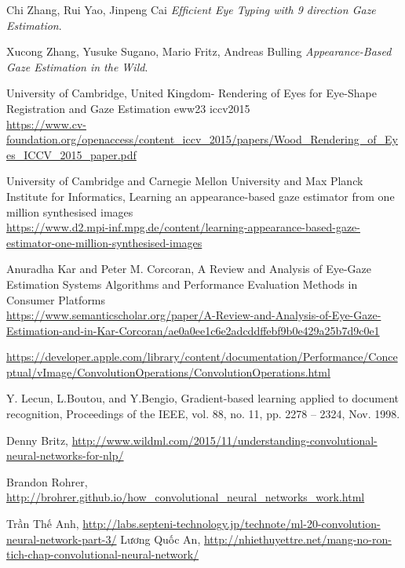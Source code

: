 \documentclass[12pt,a4paper,oneside]{book} %
\begin{document}
\begin{thebibliography}{99}

Chi Zhang, Rui Yao, Jinpeng Cai
\textit{Efﬁcient Eye Typing with 9 direction Gaze Estimation}.

Xucong Zhang, Yusuke Sugano, Mario Fritz, Andreas Bulling
\textit{Appearance-Based Gaze Estimation in the Wild}. 


University of Cambridge, United Kingdom- Rendering of Eyes for Eye-Shape Registration and Gaze Estimation eww23 iccv2015
\\\url{https://www.cv-foundation.org/openaccess/content_iccv_2015/papers/Wood_Rendering_of_Eyes_ICCV_2015_paper.pdf}

University of Cambridge and Carnegie Mellon University and Max Planck Institute for Informatics, Learning an appearance-based gaze estimator from one million synthesised images
\\\url{https://www.d2.mpi-inf.mpg.de/content/learning-appearance-based-gaze-estimator-one-million-synthesised-images}

Anuradha Kar and Peter M. Corcoran, A Review and Analysis of Eye-Gaze Estimation Systems Algorithms and Performance Evaluation Methods in Consumer Platforms
\\\url{https://www.semanticscholar.org/paper/A-Review-and-Analysis-of-Eye-Gaze-Estimation-and-in-Kar-Corcoran/ae0a0ee1c6e2adcddffebf9b0e429a25b7d9c0e1}


\url{https://developer.apple.com/library/content/documentation/Performance/Conceptual/vImage/ConvolutionOperations/ConvolutionOperations.html}

Y. Lecun, L.Boutou, and Y.Bengio, Gradient-based learning applied to document recognition, Proceedings of the IEEE, vol. 88, no. 11, pp. 2278 – 2324, Nov. 1998.

Denny Britz,
\url{http://www.wildml.com/2015/11/understanding-convolutional-neural-networks-for-nlp/}

Brandon Rohrer, \url{http://brohrer.github.io/how_convolutional_neural_networks_work.html}

Trần Thế Anh, 
\url{http://labs.septeni-technology.jp/technote/ml-20-convolution-neural-network-part-3/}
Lương Quốc An, 
\url{http://nhiethuyettre.net/mang-no-ron-tich-chap-convolutional-neural-network/}


\end{thebibliography}
\end{document}
